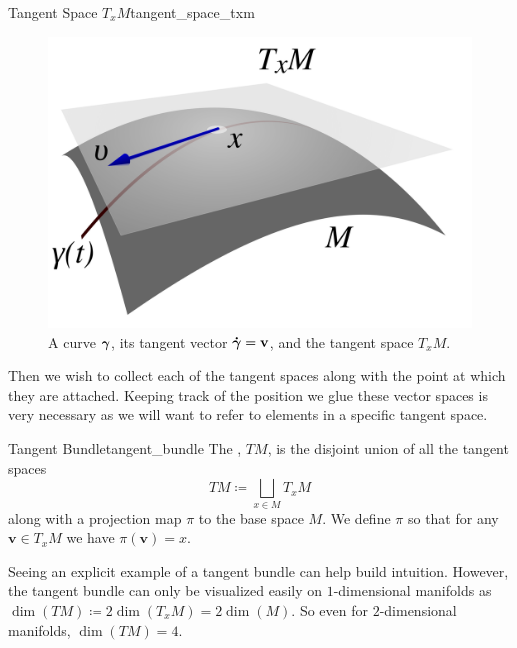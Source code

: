 
\begin{fig}{Tangent Space $T_xM$}{tangent_space_txm}
\begin{figure}[H]
    \centering
    \includegraphics[width=.4\textwidth]{tangent_space.png}
    \caption{A curve $\boldsymbol{\gamma}$, its tangent vector $\boldsymbol{\dot{\gamma}}=\mathbf{v}$, and the tangent space $T_xM$.}
    \label{fig:tangent_space}
\end{figure}
\end{fig}

Then we wish to collect each of the tangent spaces along with the point at which they are attached.  Keeping track of the position we glue these vector spaces is very necessary as we will want to refer to elements in a specific tangent space.

\begin{df}{Tangent Bundle}{tangent_bundle}
The , $TM$, is the disjoint union of all the tangent spaces
\[
TM\coloneqq \bigsqcup_{x\in M} T_xM
\]
along with a projection map $\pi$ to the base space $M$.  We define $\pi$ so that for any $\mathbf{v}\in T_xM$ we have $\pi(\mathbf{v})=x$. 
\end{df}

Seeing an explicit example of a tangent bundle can help build intuition.  However, the tangent bundle can only be visualized easily on $1$-dimensional manifolds as $\dim(TM)\coloneqq 2\dim(T_xM)=2\dim(M)$. So even for $2$-dimensional manifolds, $\dim(TM)=4$. 

